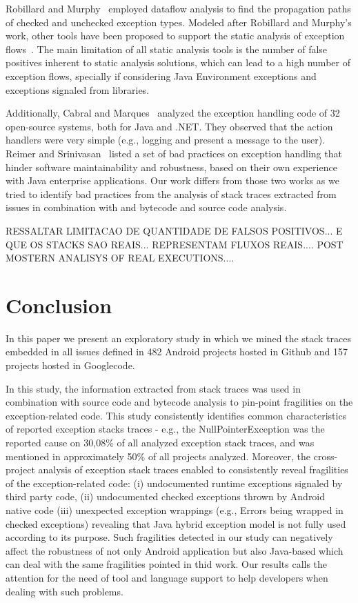 \documentclass[conference]{IEEEtran}
\begin{document}
Robillard and Murphy~\cite{Robil00}
employed dataflow analysis to find the propagation paths of checked and
unchecked exception types. Modeled after Robillard and Murphy's work, other
tools have been proposed to support the static analysis of exception
flows~\cite{coelho2008assessing}. The main limitation of all
static analysis tools is the number of false positives inherent to static analysis
solutions, which can lead to a high number of exception flows, specially if
considering Java Environment exceptions and exceptions signaled from libraries.
 
Additionally, Cabral and Marques~\cite{cabral2007exception} analyzed the
exception handling code of 32 open-source systems, both for Java and .NET. They
observed that the action handlers were very simple (e.g., logging and present a
message to the user). Reimer and Srinivasan~\cite{reimer2003analyzing} listed a
set of bad practices on exception handling that hinder software maintainability
and robustness, based on their own experience with Java enterprise applications.
Our work differs from those two works as we tried to identify bad practices from
the analysis of stack traces extracted from issues in combination with and bytecode and source
code analysis. 

RESSALTAR LIMITACAO DE QUANTIDADE DE FALSOS POSITIVOS... E QUE OS STACKS SAO REAIS...
REPRESENTAM FLUXOS REAIS.... POST MOSTERN ANALISYS OF REAL EXECUTIONS....

\enlargethispage{-2\baselineskip}

\section{Conclusion}
\label{sec:conc}

In this paper we present an exploratory study in which we mined the stack 
traces embedded in all issues defined in 482 Android projects hosted in Github and 
157 projects hosted in Googlecode.

In this study, the information extracted from stack traces was used in combination 
with source code and bytecode analysis to pin-point fragilities on the exception-related
code. 
This study  consistently identifies common characteristics of reported 
exception stacks traces - e.g., the NullPointerException was the reported cause 
on 30,08\% of all analyzed exception stack traces, and was mentioned in approximately 
50\% of all projects analyzed. Moreover,  the cross-project analysis of exception stack traces 
enabled to consistently reveal  fragilities of the exception-related code: 
(i) undocumented runtime exceptions signaled by third party code,
(ii) undocumented checked exceptions thrown by Android native code
(iii) unexpected exception wrappings (e.g., Errors being wrapped in checked exceptions) 
revealing that Java hybrid exception model is not fully used according to its purpose.
Such fragilities detected in our study can negatively affect the 
robustness of not only Android application but also Java-based 
which can deal with the same fragilities pointed in thid work. 
Our results calls the attention for the need of tool and language support to help 
developers when dealing with such problems.
\end{document}
